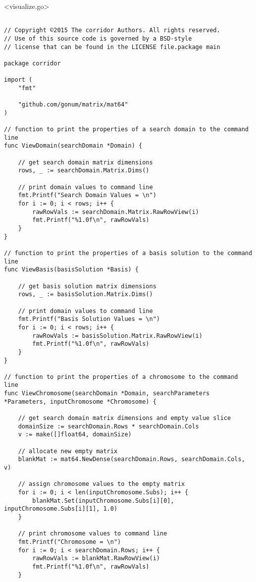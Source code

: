 \newpage

<visualize.go>

\begin{lstlisting}[basicstyle=\tiny]

// Copyright ©2015 The corridor Authors. All rights reserved.
// Use of this source code is governed by a BSD-style
// license that can be found in the LICENSE file.package main

package corridor

import (
	"fmt"

	"github.com/gonum/matrix/mat64"
)

// function to print the properties of a search domain to the command line
func ViewDomain(searchDomain *Domain) {

	// get search domain matrix dimensions
	rows, _ := searchDomain.Matrix.Dims()

	// print domain values to command line
	fmt.Printf("Search Domain Values = \n")
	for i := 0; i < rows; i++ {
		rawRowVals := searchDomain.Matrix.RawRowView(i)
		fmt.Printf("%1.0f\n", rawRowVals)
	}
}

// function to print the properties of a basis solution to the command line
func ViewBasis(basisSolution *Basis) {

	// get basis solution matrix dimensions
	rows, _ := basisSolution.Matrix.Dims()

	// print domain values to command line
	fmt.Printf("Basis Solution Values = \n")
	for i := 0; i < rows; i++ {
		rawRowVals := basisSolution.Matrix.RawRowView(i)
		fmt.Printf("%1.0f\n", rawRowVals)
	}
}

// function to print the properties of a chromosome to the command line
func ViewChromosome(searchDomain *Domain, searchParameters *Parameters, inputChromosome *Chromosome) {

	// get search domain matrix dimensions and empty value slice
	domainSize := searchDomain.Rows * searchDomain.Cols
	v := make([]float64, domainSize)

	// allocate new empty matrix
	blankMat := mat64.NewDense(searchDomain.Rows, searchDomain.Cols, v)

	// assign chromosome values to the empty matrix
	for i := 0; i < len(inputChromosome.Subs); i++ {
		blankMat.Set(inputChromosome.Subs[i][0], inputChromosome.Subs[i][1], 1.0)
	}

	// print chromosome values to command line
	fmt.Printf("Chromosome = \n")
	for i := 0; i < searchDomain.Rows; i++ {
		rawRowVals := blankMat.RawRowView(i)
		fmt.Printf("%1.0f\n", rawRowVals)
	}


\end{lstlisting}
